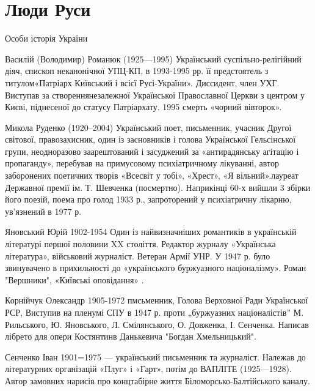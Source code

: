  
 
 

\chapter{Люди Руси}


Особи історія України

Василій (Володимир) Романюк (1925—1995) Український суспільно-релігійний діяч, єпископ неканонічної УПЦ-КП, в 1993-1995 рр. її предстоятель з титулом«Патріарх Київський і всієї Русі-України». Диссидент, член УХГ. Виступав за створеннянезалежної Української Православної Церкви з центром у Києві, піднесеної до статусу Патріархату. 1995 смерть «чорний вівторок».

Микола Руденко (1920–2004) Український поет, письменник, учасник Другої світової, правозахисник, один із засновників і голова Української Гельсінської групи, неодноразово заарештований і засуджений за «антирадянську агітацію і пропаганду», перебував на примусовому психіатричному лікуванні, автор заборонених поетичних творів «Всесвіт у тобі», «Хрест», «Я вільний».лауреат Державної премії ім. Т. Шевченка (посмертно). Наприкінці 60-х вийшли 3 збірки його поезій, поема про голод 1933 р., запроторений у психіатричну лікарню, ув’язнений в 1977 р.

Яновський Юрій 1902-1954 Один із найвизначніших романтиків в українській літературі першої половини XX століття. Редактор журналу «Українська література», військовий журналіст. Ветеран Армії УНР. У 1947 р. було звинувачено в прихильності до «українського буржуазного націоналізму». Роман "Вершники", «Київські оповідання» .

Корнійчук Олександр 1905-1972 пмсьменник, Голова Верховної Ради Української РСР, Виступив на пленумі СПУ в 1947 р. проти „буржуазних націоналістів” М. Рильського, Ю. Яновського, Л. Смілянського, О. Довженка, І. Сенченка. Написав лібрето для опери Костянтинв Данькевича "Богдан Хмельницький".

Сенченко Іван 1901=1975 — український письменник та журналіст. Належав до літературних організацій «Плуг» і «Гарт», потім до ВАПЛІТЕ (1925—1928). Автор замовних нарисів про концтабірне життя Біломорсько-Балтійського каналу.

